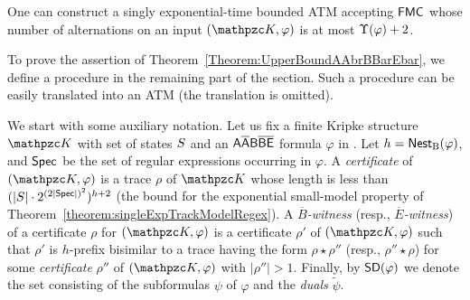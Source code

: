 \begin{theorem}\label{Theorem:UpperBoundAAbrBBarEbar} One can construct a singly exponential-time bounded ATM accepting $\mathsf{FMC}$ whose number of alternations on an input $(\Ku,\varphi)$ is at most $\Upsilon(\varphi)+2$.
\end{theorem}

To prove the assertion  of Theorem~\ref{Theorem:UpperBoundAAbrBBarEbar}, we define a procedure in the remaining part of the section. Such a procedure can be easily translated into an ATM (the translation is omitted).

We start with some auxiliary notation. Let us fix a finite Kripke structure $\Ku$ with set of states $S$ and an $\mathsf{A\overline{A}B\overline{B}\overline{E}}$ formula $\varphi$ in \nnf.
Let $h=\operatorname{\mathsf{Nest}_B}(\varphi)$, and
$\textsf{Spec}$ be the set of regular expressions occurring in $\varphi$.
%
A \emph{certificate} of $(\Ku,\varphi)$ is a trace $\rho$ of $\Ku$ whose length is less than $(|S|\cdot 2^{(2|\textsf{Spec}|)^2})^{h+2}$ (the bound for the exponential small-model property of Theorem~\ref{theorem:singleExpTrackModelRegex}).
A \emph{$\overline{B}$-witness} (resp., \emph{$\overline{E}$-witness}) of a certificate $\rho$ for $(\Ku,\varphi)$ is a certificate $\rho'$ of  $(\Ku,\varphi)$ such that $\rho'$ is $h$-prefix bisimilar to a trace having the form $\rho\star \rho''$ (resp., $\rho''\star \rho$) for some
\emph{certificate} $\rho''$ of $(\Ku,\varphi)$ with $|\rho''|>1$. Finally, by $\textsf{SD}(\varphi)$ we denote the set consisting of the subformulas $\psi$ of $\varphi$ and  the \emph{duals} $\widetilde{\psi}$.

